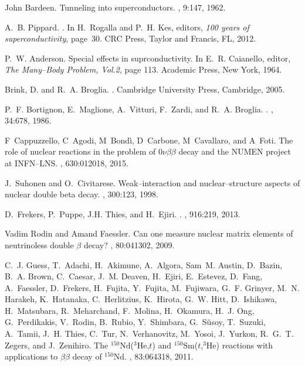\documentclass[a4paper,11pt]{article}
\numberwithin{equation}{section}
\numberwithin{figure}{section}
\numberwithin{table}{section}
\begin{document}
\begin{thebibliography}{10}
	John Bardeen.
	\newblock Tunneling into superconductors.
	, 9:147, 1962.
	
	A.~B. Pippard.
	.
	\newblock In H.~Rogalla and P.~H. Kes, editors, {\em 100 years of
		superconductivity}, page~30. CRC Press, Taylor and Francis, FL, 2012.
	
	P.~W. Anderson.
	\newblock Special effects in suprconductivity.
	\newblock In E.~R. Caianello, editor, {\em The Many--Body Problem, Vol.2}, page
	113. Academic Press, New York, 1964.
	
	{Brink, D.} and R.~A. Broglia.
	.
	\newblock Cambridge University Press, Cambridge, 2005.
	
	P.~F. Bortignon, E.~Maglione, A.~Vitturi, F.~Zardi, and R.~A. Broglia.
	.
	, 34:678, 1986.
	
	F~Cappuzzello, C~Agodi, M~Bondì, D~Carbone, M~Cavallaro, and A~Foti.
	\newblock The role of nuclear reactions in the problem of $0\nu\beta\beta$
	decay and the {NUMEN} project at {INFN--LNS}.
	, 630:012018, 2015.
	
	J.~Suhonen and O.~Civitarese.
	\newblock Weak--interaction and nuclear--structure aspects of nuclear double
	beta decay.
	, 300:123, 1998.
	
	D.~Frekers, P.~Puppe, J.H. Thies, and H.~Ejiri.
	.
	, 916:219, 2013.
	
	Vadim Rodin and Amand Faessler.
	\newblock Can one measure nuclear matrix elements of neutrinoless double
	$\ensuremath{\beta}$ decay?
	, 80:041302, 2009.
	
	C.~J. Guess, T.~Adachi, H.~Akimune, A.~Algora, Sam~M. Austin, D.~Bazin, B.~A.
	Brown, C.~Caesar, J.~M. Deaven, H.~Ejiri, E.~Estevez, D.~Fang, A.~Faessler,
	D.~Frekers, H.~Fujita, Y.~Fujita, M.~Fujiwara, G.~F. Grinyer, M.~N. Harakeh,
	K.~Hatanaka, C.~Herlitzius, K.~Hirota, G.~W. Hitt, D.~Ishikawa, H.~Matsubara,
	R.~Meharchand, F.~Molina, H.~Okamura, H.~J. Ong, G.~Perdikakis, V.~Rodin,
	B.~Rubio, Y.~Shimbara, G.~S\"usoy, T.~Suzuki, A.~Tamii, J.~H. Thies, C.~Tur,
	N.~Verhanovitz, M.~Yosoi, J.~Yurkon, R.~G.~T. Zegers, and J.~Zenihiro.
	\newblock The $^{150}\mathrm{Nd}$($^{3}\mathrm{He}$,$t$) and
	$^{150}\mathrm{Sm}$($t$,$^{3}\mathrm{He}$) reactions with applications to
	$\ensuremath{\beta}\ensuremath{\beta}$ decay of $^{150}\mathrm{Nd}$.
	, 83:064318, 2011.
	

\end{thebibliography}
\end{document}
